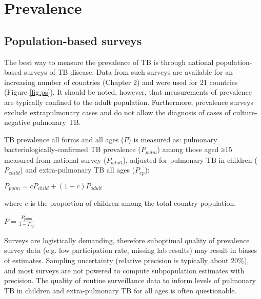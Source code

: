 \section{Prevalence}

\subsection{Population-based surveys}
The best way to measure the prevalence of TB is through national population-based surveys of TB disease\cite{18713496}\cite{WHO2011}. Data from such surveys are available for an increasing number of countries (Chapter 2) and were used for 21 countries (Figure \ref{fig:ps}). It should be noted, however, that measurements of prevalence are typically confined to the adult population. Furthermore, prevalence surveys exclude extrapulmonary cases and do not allow the diagnosis of cases of culture-negative pulmonary TB. 

TB prevalence all forms and all ages ($P$) is measured as: pulmonary bacteriologically-confirmed TB prevalence ($P_{pulm}$) among those aged ≥15 measured from national survey ($P_{adult}$), adjusted for pulmonary TB in children ($P_{child}$) and extra-pulmonary TB all ages ($P_{ep}$):

$P_{pulm} = c P_{child} + (1 − c) P_{adult}$

where $c$ is the proportion of children among the total country population.

$P = \frac{P_{pulm}}{1 - P_{ep}}$

Surveys are logistically demanding, therefore suboptimal quality of prevalence survey data (e.g. low participation rate, missing lab results) may result in biases of estimates. Sampling uncertainty (relative precision is typically about 20\%), and most surveys are not powered to compute subpopulation estimates with precision. The  quality of routine surveillance data to inform levels of pulmonary TB in children and extra-pulmonary TB for all ages is often questionable.



 